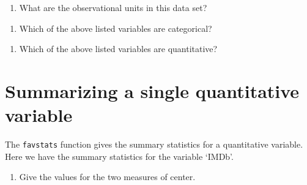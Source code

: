 \documentclass[
]{report}
\newenvironment{Shaded}{\begin{snugshade}}{\end{snugshade}}
\newcommand{\CommentTok}[1]{\textcolor[rgb]{0.56,0.35,0.01}{\textit{#1}}}
\newcommand{\KeywordTok}[1]{\textcolor[rgb]{0.13,0.29,0.53}{\textbf{#1}}}
\newcommand{\NormalTok}[1]{#1}
\newcommand{\OperatorTok}[1]{\textcolor[rgb]{0.81,0.36,0.00}{\textbf{#1}}}
\providecommand{\tightlist}{%
  \setlength{\itemsep}{0pt}\setlength{\parskip}{0pt}}
\begin{document}
\begin{enumerate}
\def\labelenumi{\arabic{enumi}.}
\tightlist
\item
  What are the observational units in this data set?
\end{enumerate}

\vspace{0.3in}

\begin{enumerate}
\def\labelenumi{\arabic{enumi}.}
\setcounter{enumi}{1}
\tightlist
\item
  Which of the above listed variables are categorical?
\end{enumerate}

\vspace{.5in}

\begin{enumerate}
\def\labelenumi{\arabic{enumi}.}
\setcounter{enumi}{2}
\tightlist
\item
  Which of the above listed variables are quantitative?
\end{enumerate}

\vspace{.5in}

\hypertarget{summarizing-a-single-quantitative-variable}{%
\section{Summarizing a single quantitative variable}\label{summarizing-a-single-quantitative-variable}}

The \texttt{favstats} function gives the summary statistics for a quantitative variable. Here we have the summary statistics for the variable `IMDb'.

\begin{Shaded}
\end{Shaded}

\begin{enumerate}
\def\labelenumi{\arabic{enumi}.}
\setcounter{enumi}{3}
\tightlist
\item
  Give the values for the two measures of center.
\end{enumerate}
\end{document}
